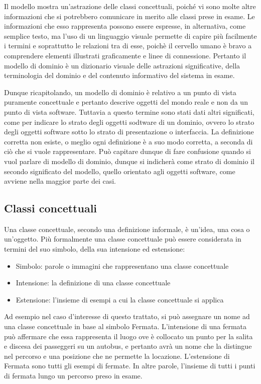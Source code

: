 Il modello mostra un’astrazione delle classi concettuali, poiché vi sono molte altre informazioni che si potrebbero comunicare in merito alle classi prese in esame. Le informazioni che esso rappresenta possono essere espresse, in alternativa, come semplice testo, ma l’uso di un linguaggio visuale permette di capire più facilmente i termini e soprattutto le relazioni tra di esse, poichè il cervello umano è bravo a comprendere elementi illustrati graficamente e linee di connessione.
Pertanto il modello di dominio è un dizionario visuale delle astrazioni significative, della terminologia del dominio e del contenuto informativo del sistema in esame.

Dunque ricapitolando, un modello di dominio è relativo a un punto di vista puramente concettuale e pertanto descrive oggetti del mondo reale e non da un punto di vista software.
Tuttavia a questo termine sono stati dati altri significati, come per indicare lo strato degli oggetti sodtware di un dominio, ovvero lo strato degli oggetti software sotto lo strato di presentazione o interfaccia.
La definizione corretta non esiste, o meglio ogni definizione è a suo modo corretta, a seconda di ciò che si vuole rappresentare. Può capitare dunque di fare confusione quando si vuol parlare  di modello di dominio, dunque si indicherà come strato di dominio il secondo significato del modello, quello orientato agli oggetti software, come avviene nella maggior parte dei casi.

\subsection{Classi concettuali} %
\label{sub:classi_concettuali}

Una classe concettuale, secondo una definizione informale, è un’idea, una cosa o un’oggetto. Più formalmente una classe concettuale può essere considerata in termini del suo simbolo, della sua intensione ed estensione:
\begin{itemize}
    \item Simbolo: parole o immagini che rappresentano una classe concettuale
    \item Intensione: la definizione di una classe concettuale
    \item Estensione: l'insieme di esempi a cui la classe concettuale si applica
\end{itemize}
Ad esempio nel caso d’interesse di questo trattato, si può assegnare un nome ad una classe concettuale in base al simbolo Fermata.
L’intensione di una fermata può affermare che essa rappresenta il luogo ove è collocato un punto per la salita e discesa dei passeggeri su un autobus, e pertanto avrà un nome che la distingue nel percorso e una posizione che ne permette la locazione.
L’estensione di Fermata sono tutti gli esempi di fermate. In altre parole, l’insieme di tutti i punti di fermata lungo un percorso preso in esame.

